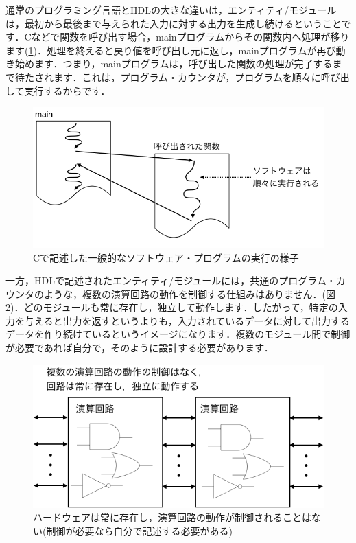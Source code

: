 \documentclass[a4paper,dvipdfmx]{jsarticle}
\begin{document}
通常のプログラミング言語とHDLの大きな違いは，エンティティ/モジュールは，最初から最後まで与えられた入力に対する出力を生成し続けるということです．Cなどで関数を呼び出す場合，mainプログラムからその関数内へ処理が移ります(\ref{fig:software_running_model})．処理を終えると戻り値を呼び出し元に返し，mainプログラムが再び動き始めます．つまり，mainプログラムは，呼び出した関数の処理が完了するまで待たされます．これは，プログラム・カウンタが，プログラムを順々に呼び出して実行するからです．

 \begin{figure}[H]
  \begin{center}
   \includegraphics[width=.75\textwidth]{chapter02_figures/software_running_model.png}
  \end{center}
  \caption{Cで記述した一般的なソフトウェア・プログラムの実行の様子 \label{fig:software_running_model}}
 \end{figure}

一方，HDLで記述されたエンティティ/モジュールには，共通のプログラム・カウンタのような，複数の演算回路の動作を制御する仕組みはありません．(図\ref{fig:hardware_instances})．どのモジュールも常に存在し，独立して動作します．したがって，特定の入力を与えると出力を返すというよりも，入力されているデータに対して出力するデータを作り続けているというイメージになります．複数のモジュール間で制御が必要であれば自分で，そのように設計する必要があります．

 \begin{figure}[H]
  \begin{center}
   \includegraphics[width=.65\textwidth]{chapter02_figures/hardware_instances.png}
  \end{center}
  \caption{ハードウェアは常に存在し，演算回路の動作が制御されることはない(制御が必要なら自分で記述する必要がある) \label{fig:hardware_instances}}
 \end{figure}
\end{document}

